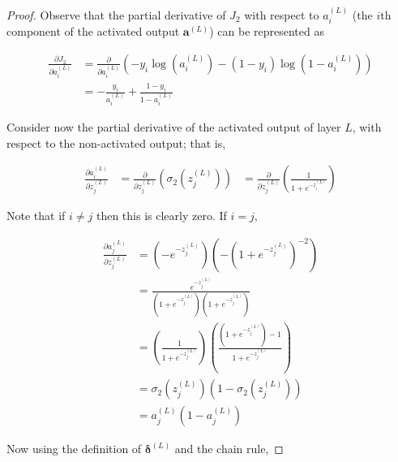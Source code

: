 \documentclass{article}[11pt]
\begin{document}
        
        \begin{proof}
            
            Observe that the partial derivative of $J_2$ with respect to $a^{(L)}_i$ (the $i$th component of the activated output $\mathbf{a}^{(L)}$) can be represented as
                    
            $$ \begin{aligned}
            \frac{\partial J_2}{\partial a^{(L)}_i}
            &= \frac{\partial}{\partial a^{(L)}_i} \left( - y_i \log(a^{(L)}_i) - (1 - y_i) \log(1 - a^{(L)}_i) \right) \\
            &= - \frac{y_i}{a^{(L)}_i} + \frac{1 - y_i}{1 - a^{(L)}_i}
            \end{aligned} $$
            
            Consider now the partial derivative of the activated output of layer $L$, with respect to the non-activated output; that is,
            
            $$ \begin{aligned}
            \frac{\partial a^{(L)}_i}{\partial z^{(L)}_j}
            &= \frac{\partial}{\partial z^{(L)}_j} \left( \sigma_2(z^{(L)}_j) \right)
            &= \frac{\partial}{\partial z^{(L)}_j} \left( \frac{1}{1 + e^{-z^{(L)}_i}} \right)
            \end{aligned} $$
                
            Note that if $i \neq j$ then this is clearly zero. If $i = j$,
            
            $$ \begin{aligned}
            \frac{\partial a^{(L)}_j}{\partial z^{(L)}_j}
            &= \left( - e^{-z^{(L)}_j} \right) \left( - \left( 1 + e^{-z^{(L)}_j} \right)^{-2} \right) \\
            &= \frac{e^{-z^{(L)}_j}}{\left( 1 + e^{-z^{(L)}_j} \right) \left( 1 + e^{-z^{(L)}_j} \right)} \\
            &= \left( \frac{1}{1 + e^{-z^{(L)}_j}} \right) \left( \frac{\left( 1 + e^{-z^{(L)}_j} \right) - 1}{1 + e^{-z^{(L)}_j}} \right) \\
            &= \sigma_2(z^{(L)}_j) \left( 1 - \sigma_2(z^{(L)}_j) \right) \\
            &= a^{(L)}_j \left( 1 - a^{(L)}_j \right)
            \end{aligned} $$
            
            Now using the definition of $\boldsymbol{\delta}^{(L)}$ and the chain rule,
            

\end{proof}
\end{document}
